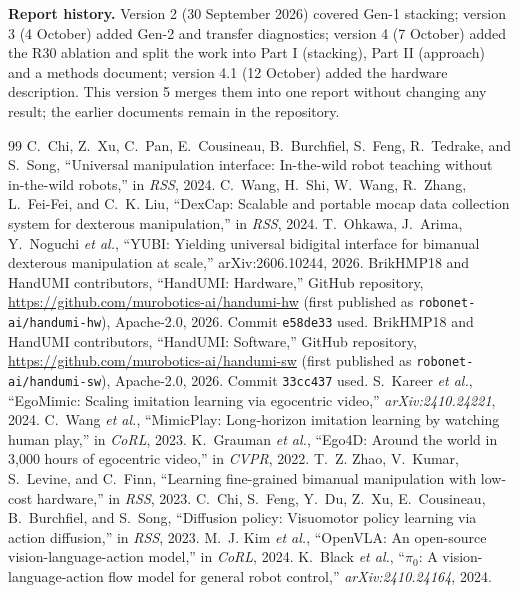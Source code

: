 \documentclass[conference,10pt]{IEEEtran}
\begin{document}
\textbf{Report history.} Version 2 (30 September 2026) covered Gen-1 stacking; version 3 (4 October) added Gen-2 and transfer
diagnostics; version 4 (7 October) added the R30 ablation and split the work into Part I (stacking), Part II (approach) and a
methods document; version 4.1 (12 October) added the hardware description. This version 5 merges them into one report without
changing any result; the earlier documents remain in the repository.

\begin{thebibliography}{99}\footnotesize
{} C.~Chi, Z.~Xu, C.~Pan, E.~Cousineau, B.~Burchfiel, S.~Feng, R.~Tedrake, and S.~Song, ``Universal manipulation interface: In-the-wild robot teaching without in-the-wild robots,'' in \emph{RSS}, 2024.
 C.~Wang, H.~Shi, W.~Wang, R.~Zhang, L.~Fei-Fei, and C.~K. Liu, ``DexCap: Scalable and portable mocap data collection system for dexterous manipulation,'' in \emph{RSS}, 2024.
 T.~Ohkawa, J.~Arima, Y.~Noguchi \emph{et al.}, ``YUBI: Yielding universal bidigital interface for bimanual dexterous manipulation at scale,'' arXiv:2606.10244, 2026.
 BrikHMP18 and HandUMI contributors, ``HandUMI: Hardware,'' GitHub repository, \url{https://github.com/murobotics-ai/handumi-hw} (first published as \texttt{robonet-ai/handumi-hw}), Apache-2.0, 2026. Commit \texttt{e58de33} used.
 BrikHMP18 and HandUMI contributors, ``HandUMI: Software,'' GitHub repository, \url{https://github.com/murobotics-ai/handumi-sw} (first published as \texttt{robonet-ai/handumi-sw}), Apache-2.0, 2026. Commit \texttt{33cc437} used.
 S.~Kareer \emph{et al.}, ``EgoMimic: Scaling imitation learning via egocentric video,'' \emph{arXiv:2410.24221}, 2024.
 C.~Wang \emph{et al.}, ``MimicPlay: Long-horizon imitation learning by watching human play,'' in \emph{CoRL}, 2023.
 K.~Grauman \emph{et al.}, ``Ego4D: Around the world in 3,000 hours of egocentric video,'' in \emph{CVPR}, 2022.
 T.~Z. Zhao, V.~Kumar, S.~Levine, and C.~Finn, ``Learning fine-grained bimanual manipulation with low-cost hardware,'' in \emph{RSS}, 2023.
 C.~Chi, S.~Feng, Y.~Du, Z.~Xu, E.~Cousineau, B.~Burchfiel, and S.~Song, ``Diffusion policy: Visuomotor policy learning via action diffusion,'' in \emph{RSS}, 2023.
 M.~J. Kim \emph{et al.}, ``OpenVLA: An open-source vision-language-action model,'' in \emph{CoRL}, 2024.
 K.~Black \emph{et al.}, ``$\pi_0$: A vision-language-action flow model for general robot control,'' \emph{arXiv:2410.24164}, 2024.

\end{thebibliography}
\end{document}
